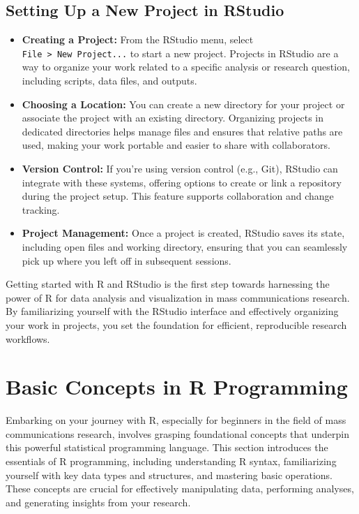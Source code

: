 \documentclass[
]{book}
\begin{document}
\subsection*{Setting Up a New Project in RStudio}\label{setting-up-a-new-project-in-rstudio}

\begin{itemize}
\item
  \textbf{Creating a Project:} From the RStudio menu, select \texttt{File\ \textgreater{}\ New\ Project...} to start a new project. Projects in RStudio are a way to organize your work related to a specific analysis or research question, including scripts, data files, and outputs.
\item
  \textbf{Choosing a Location:} You can create a new directory for your project or associate the project with an existing directory. Organizing projects in dedicated directories helps manage files and ensures that relative paths are used, making your work portable and easier to share with collaborators.
\item
  \textbf{Version Control:} If you're using version control (e.g., Git), RStudio can integrate with these systems, offering options to create or link a repository during the project setup. This feature supports collaboration and change tracking.
\item
  \textbf{Project Management:} Once a project is created, RStudio saves its state, including open files and working directory, ensuring that you can seamlessly pick up where you left off in subsequent sessions.
\end{itemize}

Getting started with R and RStudio is the first step towards harnessing the power of R for data analysis and visualization in mass communications research. By familiarizing yourself with the RStudio interface and effectively organizing your work in projects, you set the foundation for efficient, reproducible research workflows.

\section{Basic Concepts in R Programming}\label{basic-concepts-in-r-programming}

Embarking on your journey with R, especially for beginners in the field of mass communications research, involves grasping foundational concepts that underpin this powerful statistical programming language. This section introduces the essentials of R programming, including understanding R syntax, familiarizing yourself with key data types and structures, and mastering basic operations. These concepts are crucial for effectively manipulating data, performing analyses, and generating insights from your research.
\end{document}
